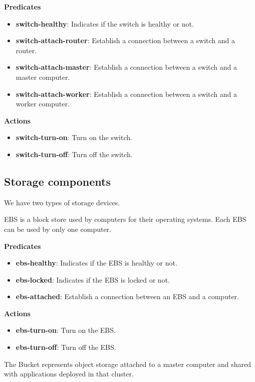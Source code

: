 \documentclass[letterpaper]{article}
\begin{document}
\textbf{Predicates}

\begin{itemize}
    \item \textbf{switch-healthy}: Indicates if the switch is healthy or not.
    \item \textbf{switch-attach-router}: Establish a connection between a switch and a router.
    \item \textbf{switch-attach-master}: Establish a connection between a switch and a master computer.
    \item \textbf{switch-attach-worker}: Establish a connection between a switch and a worker computer.
\end{itemize}

\textbf{Actions}

\begin{itemize}
    \item \textbf{switch-turn-on}: Turn on the switch.
    \item \textbf{switch-turn-off}: Turn off the switch.
\end{itemize}

\subsection{Storage components}\label{sec:implementation3}

We have two types of storage devices.

EBS is a block store used by computers for their operating systems. Each EBS can be used by only one computer.

\textbf{Predicates}

\begin{itemize}
    \item \textbf{ebs-healthy}: Indicates if the EBS is healthy or not.
    \item \textbf{ebs-locked}: Indicates if the EBS is locked or not.
    \item \textbf{ebs-attached}: Establish a connection between an EBS and a computer.
\end{itemize}

\textbf{Actions}

\begin{itemize}
    \item \textbf{ebs-turn-on}: Turn on the EBS.
    \item \textbf{ebs-turn-off}: Turn off the EBS.
\end{itemize}

The Bucket represents object storage attached to a master computer and shared with applications deployed in that cluster.
\end{document}
